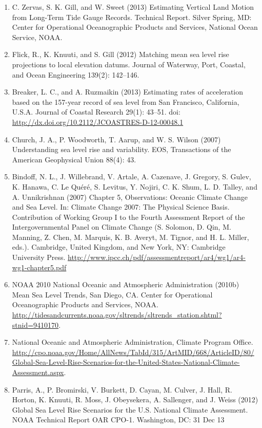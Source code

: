 \documentclass[10pt]{amsart}
\begin{document}
\begin{enumerate}
\item C. Zervas, S. K. Gill, and W. Sweet (2013) Estimating Vertical Land Motion from Long-Term Tide Gauge Records. Technical Report. Silver Spring, MD: Center for Operational Oceanographic Products and Services, National Ocean Service, NOAA.
\item Flick, R., K. Knuuti, and S. Gill (2012) Matching mean sea level rise projections to local elevation datums. Journal of Waterway, Port, Coastal, and Ocean Engineering 139(2): 142–146.
\item Breaker, L. C., and A. Ruzmaikin (2013) Estimating rates of acceleration based on the 157-year record of sea level from San Francisco, California, U.S.A. Journal of Coastal Research 29(1): 43–51. doi: \url{http://dx.doi.org/10.2112/JCOASTRES-D-12-00048.1}
\item Church, J. A., P. Woodworth, T. Aarup, and W. S. Wilson (2007) Understanding sea level rise and variability. EOS, Transactions of the American Geophysical Union 88(4): 43.
\item Bindoff, N. L., J. Willebrand, V. Artale, A. Cazenave, J. Gregory, S. Gulev, K. Hanawa, C. Le Quéré, S. Levitus, Y. Nojiri, C. K. Shum, L. D. Talley, and A. Unnikrishnan (2007) Chapter 5, Observations: Oceanic Climate Change and Sea Level. In: Climate Change 2007: The Physical Science Basis. Contribution of Working Group I to the Fourth Assessment Report of the Intergovernmental Panel on Climate Change (S. Solomon, D. Qin, M. Manning, Z. Chen, M. Marquis, K. B. Averyt, M. Tignor, and H. L. Miller, eds.). Cambridge, United Kingdom, and New York, NY: Cambridge University Press. \url{http://www.ipcc.ch/pdf/assessmentreport/ar4/wg1/ar4-wg1-chapter5.pdf}
\item NOAA 2010 National Oceanic and Atmospheric Administration (2010b) Mean Sea Level Trends, San Diego, CA. Center for Operational Oceanographic Products and Services, NOAA. \url{http://tidesandcurrents.noaa.gov/sltrends/sltrends_station.shtml?stnid=9410170}.
\item National Oceanic and Atmospheric Administration, Climate Program Office. \url{http://cpo.noaa.gov/Home/AllNews/TabId/315/ArtMID/668/ArticleID/80/Global-Sea-Level-Rise-Scenarios-for-the-United-States-National-Climate-Assessment.aspx}.
\item Parris, A., P. Bromirski, V. Burkett, D. Cayan, M. Culver, J. Hall, R. Horton, K. Knuuti, R. Moss, J. Obeysekera, A. Sallenger, and J. Weiss (2012) Global Sea Level Rise Scenarios for the U.S. National Climate Assessment. NOAA Technical Report OAR CPO-1. Washington, DC: 31 Dec 13

\end{enumerate}
\end{document}
